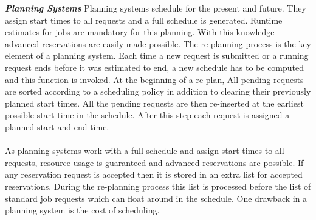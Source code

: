 \textbf{\textit{Planning Systems }}Planning systems schedule for the present and future. They assign start times to all requests and a full schedule is generated. Runtime estimates for jobs are mandatory for this planning. With this knowledge advanced reservations are easily made possible. The re-planning process is the key element of a planning system. Each time a new request is submitted or a running request ends before it was estimated to end, a new schedule has to be computed and this function is invoked. At the beginning of a re-plan, All pending requests are sorted according to a scheduling policy in addition to clearing their previously planned start times. All the pending requests are then re-inserted at the earliest possible start time in the schedule. After this step each request is assigned a planned start and end time.\\ \\
As planning systems work with a full schedule and assign start times to all requests, resource usage is guaranteed and advanced reservations are possible. If any reservation request is accepted then it is stored in an extra list for accepted reservations. During the re-planning process this list is processed before the list of standard job requests which can float around in the schedule. One drawback in a planning system is the cost of scheduling.
